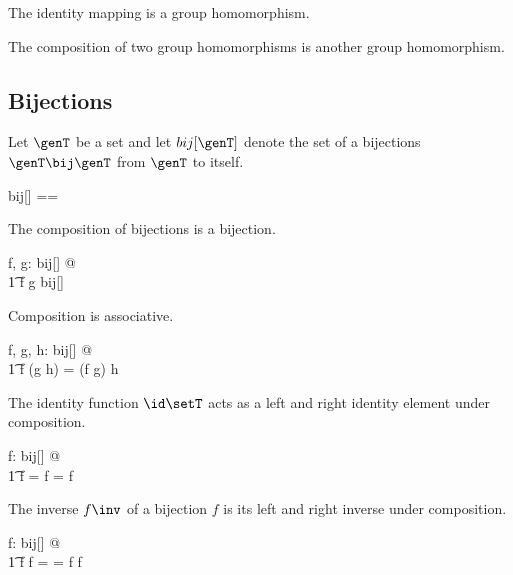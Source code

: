\documentclass{amsart}
\begin{document}
\begin{remark}
The identity mapping is a group homomorphism.
\end{remark}

\begin{remark}
The composition of two group homomorphisms is another group homomorphism.
\end{remark}

\subsection{Bijections}

Let $\genT$ be a set and let $bij[\genT]$ denote the set of a bijections $\genT \bij \genT$ from $\genT$ to itself.
\begin{zed}
	bij[\genT] == \genT \bij \genT
\end{zed}

\begin{remark}
The composition of bijections is a bijection.

\begin{zed}
	\forall f, g: bij[\setT] @ \\
	\t1	f \circ g \in bij[\setT]
\end{zed}

\end{remark}

\begin{remark}
Composition is associative.

\begin{zed}
	\forall f, g, h: bij[\setT] @ \\
	\t1	f \circ (g \circ h) = (f \circ g) \circ h
\end{zed}

\end{remark}

\begin{remark}
The identity function $\id \setT$ acts as a left and right identity element under composition.

\begin{zed}
	\forall f: bij[\setT] @ \\
	\t1	 \id \setT \circ f = f = f \circ \id \setT
\end{zed}

\end{remark}

\begin{remark}
The inverse $f \inv$ of a bijection $f$ is its left and right inverse under composition.

\begin{zed}
	\forall f: bij[\setT] @ \\
	\t1	f \circ f \inv = \id \setT = f \inv \circ f
\end{zed}

\end{remark}
\end{document}
